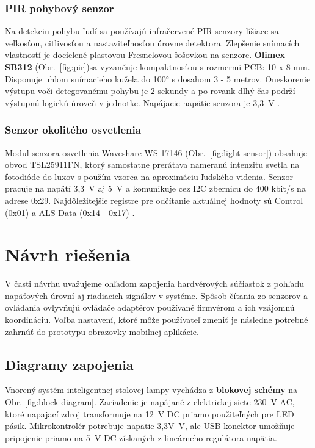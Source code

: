 \documentclass[12pt, a4paper]{article}
\begin{document}
\subsubsection{PIR pohybový senzor}
Na detekciu pohybu ľudí sa používajú infračervené PIR senzory líšiace sa veľkosťou, citlivosťou a nastaviteľnosťou úrovne detektora. Zlepšenie snímacích vlastností je docielené plastovou Fresnelovou šošovkou na senzore. \textbf{Olimex SB312} (Obr.~\ref{fig:pir})sa vyzančuje kompaktnosťou s rozmermi PCB: 10 x 8 mm. Disponuje uhlom snímacieho kužela do 100° s dosahom 3 - 5 metrov. Oneskorenie výstupu voči detegovanému pohybu je 2 sekundy a po rovank dlhý čas podrží výstupnú logickú úroveň v jednotke. Napájacie napätie senzora je 3,3~V \cite{olimex_pir-sb312_nodate}.

\subsubsection{Senzor okolitého osvetlenia}
Modul senzora osvetlenia Waveshare WS-17146 (Obr.~\ref{fig:light-sensor}) obsahuje obvod TSL25911FN, ktorý samostatne prerátava nameranú intenzitu svetla na fotodióde do luxov s použím vzorca na aproximáciu ľudského videnia. Senzor pracuje na napätí 3,3~V aj 5~V a komunikuje cez I2C zbernicu do 400 kbit/s na adrese 0x29. Najdôležitejšie registre pre odčítanie aktuálnej hodnoty sú Control (0x01) a ALS Data (0x14 - 0x17) \cite{noauthor_tsl25911_nodate}.

\section{Návrh riešenia}
V časti návrhu uvažujeme ohľadom zapojenia hardvérových súčiastok z pohľadu napäťových úrovní aj riadiacich signálov v systéme. Spôsob čítania zo senzorov a ovládania ovlyvňujú ovládače adaptérov používané firmvérom a ich vzájomnú koordináciu. Voľba nastavení, ktoré môže používateľ zmeniť je následne potrebné zahrnúť do prototypu obrazovky mobilnej aplikácie.

\subsection{Diagramy zapojenia}
Vnorený systém inteligentnej stolovej lampy vychádza z \textbf{blokovej schémy} na Obr. \ref{fig:block-diagram}. Zariadenie je napájané z elektrickej siete 230~V AC, ktoré napajací zdroj transformuje na 12~V DC priamo použiteľných pre LED pásik. Mikrokontrolér potrebuje napätie 3,3V~V, ale USB konektor umožňuje pripojenie priamo na 5~V DC získaných z lineárneho regulátora napätia.
\end{document}
